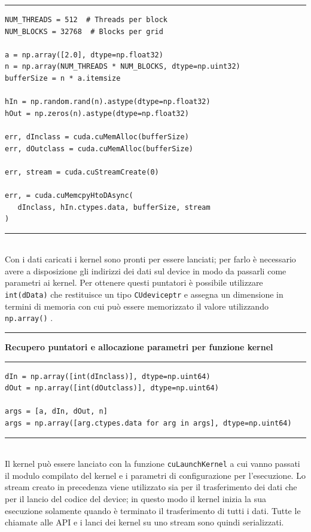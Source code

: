\documentclass[12pt,a4paper]{report}
\begin{document}
\noindent\rule[0.5ex]{\linewidth}{1pt}
\begin{lstlisting}
NUM_THREADS = 512  # Threads per block
NUM_BLOCKS = 32768  # Blocks per grid

a = np.array([2.0], dtype=np.float32)
n = np.array(NUM_THREADS * NUM_BLOCKS, dtype=np.uint32)
bufferSize = n * a.itemsize

hIn = np.random.rand(n).astype(dtype=np.float32)
hOut = np.zeros(n).astype(dtype=np.float32)

err, dInclass = cuda.cuMemAlloc(bufferSize)
err, dOutclass = cuda.cuMemAlloc(bufferSize)

err, stream = cuda.cuStreamCreate(0)

err, = cuda.cuMemcpyHtoDAsync(
   dInclass, hIn.ctypes.data, bufferSize, stream
)

\end{lstlisting}
\noindent\rule[0.5ex]{\linewidth}{1pt} \\[10pt]
Con i dati caricati i kernel sono pronti per essere lanciati; per farlo è necessario avere a disposizione gli indirizzi dei dati sul device in modo da passarli come parametri ai kernel. Per ottenere questi puntatori è possibile utilizzare \verb|int(dData)| che restituisce un tipo \verb|CUdeviceptr| e assegna un dimensione in termini di memoria con cui può essere memorizzato il valore utilizzando \verb|np.array()| . \newpage

\noindent\rule[0.5ex]{\linewidth}{2pt}
\small{\textbf{Recupero puntatori e allocazione parametri per funzione kernel}} \\
\noindent\rule[0.5ex]{\linewidth}{1pt}
\begin{lstlisting}
dIn = np.array([int(dInclass)], dtype=np.uint64)
dOut = np.array([int(dOutclass)], dtype=np.uint64)

args = [a, dIn, dOut, n]
args = np.array([arg.ctypes.data for arg in args], dtype=np.uint64)
\end{lstlisting}
\noindent\rule[0.5ex]{\linewidth}{1pt} \\[10pt]
Il kernel può essere lanciato con la funzione \verb|cuLaunchKernel| a cui vanno passati il modulo compilato del kernel e i parametri di configurazione per l'esecuzione. Lo stream creato in precedenza viene utilizzato sia per il trasferimento dei dati che per il lancio del codice del device; in questo modo il kernel inizia la sua esecuzione solamente quando è terminato il trasferimento di tutti i dati. Tutte le chiamate alle API e i lanci dei kernel su uno stream sono quindi serializzati.\newline
\end{document}
